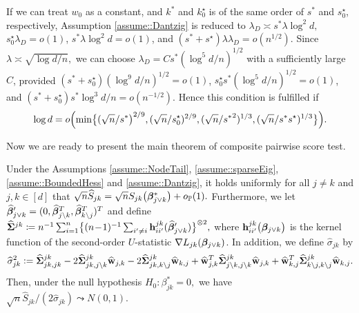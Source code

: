 \documentclass[twoside,11pt]{article}
\newcommand{\defeq}{\vcentcolon=}
\newcommand*{\hbbeta}{\hat{\bbeta}}
\newcommand*{\bbetas}{\bbeta^*}
\newcommand*{\hSigma}{\hat{\bSigma}}
\newcommand*{\hw}{\hat{\wb}}
\begin{document}
If we can treat $w_0$ as a constant, and $k^*$ and $k_0^\star$ is of the same order of $s^*$ and $s_0^\star$, respectively,  Assumption \ref{assume::Dantzig} is reduced to $\lambda_D \asymp s^* \lambda \log^2 d,$ $s_0^\star\lambda_D  = o(1)$,  $ s^*\lambda  \log^2 d = o(1)  $, and $(s^* \!\!+\! s^\star ) \lambda \lambda_D = o(n^{1/2}).$ Since $\lambda \asymp \sqrt{\log d/n},$ we can choose $\lambda_D = C s^*( \log^5 d/n)^{1/2}$ with a sufficiently large $C$, provided  $(s^* + s_0^\star )(\log ^9 d /n)^{1/2} = o(1)$, $ s_0^\star  s^* (\log^5 d/n)^{1/2} = o(1)$, and $(s^* + s_0^\star ) s^* \log ^3d/n = o(n^{-1/2}).$  Hence this  condition is fulfilled if  $$\log d =o\Bigl ( \min \bigl \{  (\sqrt {n} / s^* \bigr )^{2/9}, (\sqrt {n} / s_0^\star  )^{2/9} ,   ( \sqrt{n} / {s^*}^2  ) ^{1/3} ,  ( \sqrt{n} / s^* s^\star   ) ^{1/3}\bigr \}\Bigr). $$


Now we are ready to present the main theorem of composite pairwise score test.
\begin{theorem}\label{thm::score}
Under the Assumptions \ref{assume::NodeTail}, \ref{assume::sparseEig}, \ref{assume::BoundedHess} and  \ref{assume::Dantzig},  %
it holds uniformly for all $j\!\neq\! k$ and $j,k\!\in\![d]$ that
$
\sqrt{n} \hat{S}_{jk} = \sqrt{n} S_{jk}\bigl(\bbetas_{j\vee k}\bigr) + o_{\PP}(1).
$
Furthermore, we let $\hbbeta_{j\vee k}' = (0,\hbbeta_{j\setminus k}^T,\hbbeta_{k\setminus j}^T)^T$ and define  
$
\hSigma^{jk}\coloneqq n^{-1} \sum_{i=1}^n \bigl\{(n\!-\!1)^{-1}\sum_{i'\neq i} \hb_{ii'}^{jk}(\hbbeta_{j \vee k}') \bigr\}^{\otimes 2},
$
where $\mathbf{h}_{ii'}^{jk} \bigl(\bm{\beta}_{j\vee k}\bigr) $ is the kernel function of the second-order $U$-statistic  $\nabla L_{jk} (\bm{\beta}_{j \vee k} )$.
In addition, we define $\hat \sigma_{jk}$ by 
$$
\hat\sigma_{jk}^2 \defeq \hSigma^{jk}_{jk,jk} - 2 \hSigma_{jk,j\setminus k}^{jk} \hw_{j,k} -2 \hSigma_{jk,k\setminus j}^{jk} \hw_{k,j}  + {\hw_{j,k}}^T \hSigma_{j\setminus k,j\setminus k} ^{jk}\hw_{j,k} + {\hw_{k,j} }^T \hSigma_{k\setminus j,k\setminus j} ^{jk}\hw_{k,j}.
$$
Then, under the null hypothesis $H_0\colon \beta_{jk}^* = 0,$  we have $\sqrt{n} \hat{S}_{jk} \big/(2\hat{\sigma}_{jk}) \leadsto
N(0,1)$. 
\end{theorem}
\end{document}
